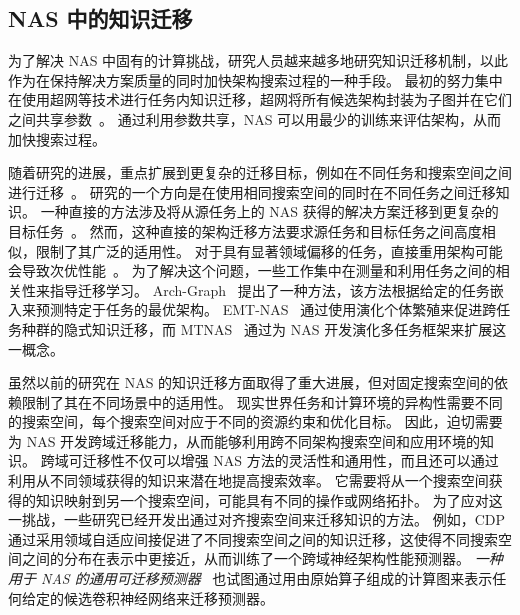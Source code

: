 \documentclass[../main_zh.tex]{subfiles}
\begin{document}
\subsection{NAS 中的知识迁移}

为了解决 NAS 中固有的计算挑战，研究人员越来越多地研究知识迁移机制，以此作为在保持解决方案质量的同时加快架构搜索过程的一种手段。
最初的努力集中在使用超网等技术进行任务内知识迁移，超网将所有候选架构封装为子图并在它们之间共享参数~\cite{DBLP:conf/cvpr/ZophVSL18,pham_efficient_2018,Huang2023SplitLevelEN}。
通过利用参数共享，NAS 可以用最少的训练来评估架构，从而加快搜索过程。

随着研究的进展，重点扩展到更复杂的迁移目标，例如在不同任务和搜索空间之间进行迁移~\cite{DBLP:conf/cvpr/ZophVSL18}。
研究的一个方向是在使用相同搜索空间的同时在不同任务之间迁移知识。
一种直接的方法涉及将从源任务上的 NAS 获得的解决方案迁移到更复杂的目标任务~\cite{DBLP:conf/cvpr/ZophVSL18,DBLP:conf/iclr/LiuSY19}。
然而，这种直接的架构迁移方法要求源任务和目标任务之间高度相似，限制了其广泛的适用性。
对于具有显著领域偏移的任务，直接重用架构可能会导致次优性能~\cite{DBLP:conf/iclr/LiuSY19}。
为了解决这个问题，一些工作集中在测量和利用任务之间的相关性来指导迁移学习。
Arch-Graph~\cite{DBLP:conf/cvpr/HuangHLCXLL22} 提出了一种方法，该方法根据给定的任务嵌入来预测特定于任务的最优架构。
EMT-NAS~\cite{DBLP:conf/cvpr/LiaoJD23} 通过使用演化个体繁殖来促进跨任务种群的隐式知识迁移，而 MTNAS~\cite{DBLP:journals/tec/ZhouWFLWT24} 通过为 NAS 开发演化多任务框架来扩展这一概念。

虽然以前的研究在 NAS 的知识迁移方面取得了重大进展，但对固定搜索空间的依赖限制了其在不同场景中的适用性。
现实世界任务和计算环境的异构性需要不同的搜索空间，每个搜索空间对应于不同的资源约束和优化目标。
因此，迫切需要为 NAS 开发跨域迁移能力，从而能够利用跨不同架构搜索空间和应用环境的知识。
跨域可迁移性不仅可以增强 NAS 方法的灵活性和通用性，而且还可以通过利用从不同领域获得的知识来潜在地提高搜索效率。
它需要将从一个搜索空间获得的知识映射到另一个搜索空间，可能具有不同的操作或网络拓扑。
为了应对这一挑战，一些研究已经开发出通过对齐搜索空间来迁移知识的方法。
例如，CDP~\cite{DBLP:conf/nips/0002TLW022} 通过采用领域自适应间接促进了不同搜索空间之间的知识迁移，这使得不同搜索空间之间的分布在表示中更接近，从而训练了一个跨域神经架构性能预测器。
\textit{一种用于 NAS 的通用可迁移预测器}~\cite{DBLP:conf/sdm/HanMCRSZ0JN23} 也试图通过用由原始算子组成的计算图来表示任何给定的候选卷积神经网络来迁移预测器。
\end{document}
